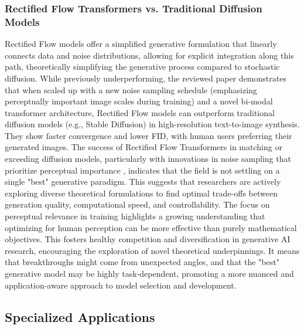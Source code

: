 \documentclass[a4paper]{article}
\begin{document}
\subsubsection*{Rectified Flow Transformers vs. Traditional Diffusion Models}
Rectified Flow models offer a simplified generative formulation that linearly connects data and noise distributions, allowing for explicit integration along this path, theoretically simplifying the generative process compared to stochastic diffusion. While previously underperforming, the reviewed paper \cite{Esser2024ScalingRectifiedFlow} demonstrates that when scaled up with a new noise sampling schedule (emphasizing perceptually important image scales during training) and a novel bi-modal transformer architecture, Rectified Flow models can outperform traditional diffusion models (e.g., Stable Diffusion) in high-resolution text-to-image synthesis. They show faster convergence and lower FID, with human users preferring their generated images. The success of Rectified Flow Transformers in matching or exceeding diffusion models, particularly with innovations in noise sampling that prioritize perceptual importance , indicates that the field is not settling on a single "best" generative paradigm. This suggests that researchers are actively exploring diverse theoretical formulations to find optimal trade-offs between generation quality, computational speed, and controllability. The focus on perceptual relevance in training highlights a growing understanding that optimizing for human perception can be more effective than purely mathematical objectives. This fosters healthy competition and diversification in generative AI research, encouraging the exploration of novel theoretical underpinnings. It means that breakthroughs might come from unexpected angles, and that the "best" generative model may be highly task-dependent, promoting a more nuanced and application-aware approach to model selection and development.

\subsection{Specialized Applications}
\end{document}

